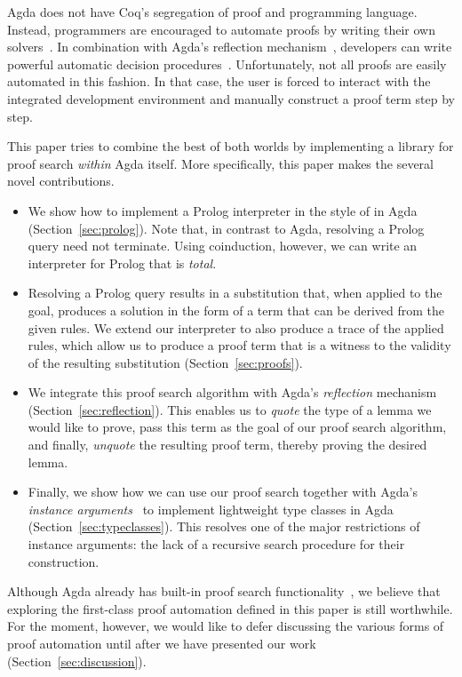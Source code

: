 \documentclass[preprint]{sigplanconf}
\begin{document}
Agda does not have Coq's segregation of proof and programming
language.  Instead, programmers are encouraged to automate proofs by
writing their own solvers~\cite{ulf-tphols}. In combination with
Agda's reflection mechanism~\cite{agda-relnotes-228,van-der-walt}, developers can write
powerful automatic decision procedures~\cite{allais}. Unfortunately,
not all proofs are easily automated in this fashion. In that case,
the user is forced to interact with the integrated development
environment and manually construct a proof term step by step.

This paper tries to combine the best of both worlds by implementing a
library for proof search \emph{within} Agda itself. More specifically,
this paper makes the several novel contributions.

\begin{itemize}
\item %
  We show how to implement a Prolog interpreter in the style of
  \citet{stutterheim} in Agda (Section~\ref{sec:prolog}). Note that,
  in contrast to Agda, resolving a Prolog query need not terminate.
  Using coinduction, however, we can write an interpreter for Prolog
  that is \emph{total}.
\item %
  Resolving a Prolog query results in a substitution that, when applied
  to the goal, produces a solution in the form of a term that can be
  derived from the given rules.
  We extend our interpreter to also produce a trace of the applied
  rules, which allow us to produce a proof term that is a witness to
  the validity of the resulting substitution (Section~\ref{sec:proofs}).
\item %
  We integrate this proof search algorithm with Agda's
  \emph{reflection} mechanism (Section~\ref{sec:reflection}). This
  enables us to \emph{quote} the type of a lemma we would like to
  prove, pass this term as the goal of our proof search algorithm, and
  finally, \emph{unquote} the resulting proof term, thereby proving
  the desired lemma.
\item %
  Finally, we show how we can use our proof search together with
  Agda's \emph{instance arguments}~\cite{instance-args} to implement
  lightweight type classes in Agda (Section~\ref{sec:typeclasses}).
  This resolves one of the major restrictions of instance arguments:
  the lack of a recursive search procedure for their construction.
\end{itemize}

Although Agda already has built-in proof search
functionality~\cite{lindblad}, we believe that exploring the
first-class proof automation defined in this paper is still
worthwhile. For the moment, however, we would like to defer discussing
the various forms of proof automation until after we have
presented our work (Section~\ref{sec:discussion}).
\end{document}

